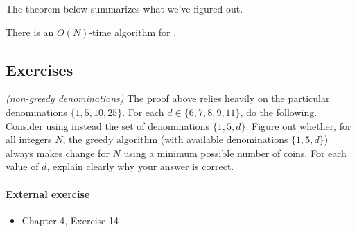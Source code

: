 The theorem below summarizes what we've figured out.
\begin{theorem}
  There is an $O(N)$-time algorithm for .
\end{theorem}

\subsection{Exercises}

\exercise \emph{(non-greedy denominations)}
The proof above relies heavily on the particular denominations $\{1,5,10,25\}$.
For each $d\in\{6,7,8,9,11\}$, do the following.
Consider using instead the set of denominations $\{1, 5, d\}$.
Figure out whether,
for all integers $N$, the greedy algorithm (with available denominations $\{1, 5, d\}$)
always makes change for $N$ using a minimum possible number of coins.
For each value of $d$, explain clearly why your answer is correct.

\paragraph{External exercise}
\begin{itemize}
\item  \JE Chapter 4, Exercise 14
\end{itemize}

